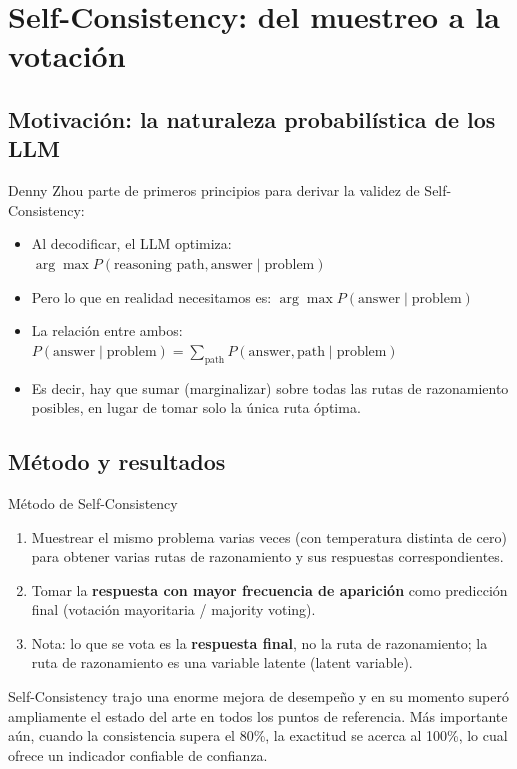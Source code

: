 \section{Self-Consistency: del muestreo a la votación}

\subsection{Motivación: la naturaleza probabilística de los LLM}

Denny Zhou parte de primeros principios para derivar la validez de Self-Consistency:

\begin{itemize}
    \item Al decodificar, el LLM optimiza: $\arg\max P(\text{reasoning path}, \text{answer} \mid \text{problem})$
    \item Pero lo que en realidad necesitamos es: $\arg\max P(\text{answer} \mid \text{problem})$
    \item La relación entre ambos: $P(\text{answer} \mid \text{problem}) = \sum_{\text{path}} P(\text{answer}, \text{path} \mid \text{problem})$
    \item Es decir, hay que sumar (marginalizar) sobre todas las rutas de razonamiento posibles, en lugar de tomar solo la única ruta óptima.
\end{itemize}

\subsection{Método y resultados}

\begin{importantbox}{Método de Self-Consistency}
\begin{enumerate}
    \item Muestrear el mismo problema varias veces (con temperatura distinta de cero) para obtener varias rutas de razonamiento y sus respuestas correspondientes.
    \item Tomar la \textbf{respuesta con mayor frecuencia de aparición} como predicción final (votación mayoritaria / majority voting).
    \item Nota: lo que se vota es la \textbf{respuesta final}, no la ruta de razonamiento; la ruta de razonamiento es una variable latente (latent variable).
\end{enumerate}
\end{importantbox}

Self-Consistency trajo una enorme mejora de desempeño y en su momento superó ampliamente el estado del arte en todos los puntos de referencia. Más importante aún, cuando la consistencia supera el 80\%, la exactitud se acerca al 100\%, lo cual ofrece un indicador confiable de confianza.


